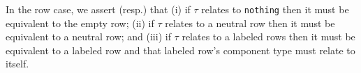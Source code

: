 \documentclass[authoryear, acmsmall, screen, review, nonacm]{acmart}
\begin{document}
In the row case, we assert (resp.) that (i) if $\tau$ relates to \verb!nothing! then it must be equivalent to the empty row; (ii) if $\tau$ relates to a neutral row then it must be equivalent to a neutral row; and (iii) if $\tau$ relates to a labeled rows then it must be equivalent to a labeled row and that labeled row's component type must relate to itself.
\begin{code}%
\>[0]\AgdaSpace{}%
\AgdaSymbol{\{}\AgdaSpace{}%
\AgdaSymbol{=}\AgdaSpace{}%
\AgdaOperator{\AgdaInductiveConstructor{R[}}\AgdaSpace{}%
\AgdaSpace{}%
\AgdaOperator{\AgdaInductiveConstructor{]}}\AgdaSymbol{\}}\AgdaSpace{}%
\AgdaSpace{}%
\AgdaSpace{}%
\AgdaSymbol{=}\AgdaSpace{}%
\AgdaSpace{}%
\AgdaSpace{}%
\<%
\\
\>[0]\AgdaSpace{}%
\AgdaSymbol{\{}\AgdaSpace{}%
\AgdaSymbol{=}\AgdaSpace{}%
\AgdaOperator{\AgdaInductiveConstructor{R[}}\AgdaSpace{}%
\AgdaSpace{}%
\AgdaOperator{\AgdaInductiveConstructor{]}}\AgdaSymbol{\}}\AgdaSpace{}%
\AgdaSpace{}%
\AgdaSymbol{(}\AgdaSpace{}%
\AgdaSymbol{(}\AgdaSpace{}%
\AgdaSymbol{))}\AgdaSpace{}%
\AgdaSymbol{=}\AgdaSpace{}%
\AgdaSpace{}%
\AgdaSpace{}%
\AgdaSymbol{(}\AgdaSpace{}%
\AgdaSymbol{)}\<%
\\
\>[0]\AgdaSpace{}%
\AgdaSymbol{\{}\AgdaSpace{}%
\AgdaSymbol{=}\AgdaSpace{}%
\AgdaOperator{\AgdaInductiveConstructor{R[}}\AgdaSpace{}%
\AgdaSpace{}%
\AgdaOperator{\AgdaInductiveConstructor{]}}\AgdaSymbol{\}}\AgdaSpace{}%
\AgdaSpace{}%
\AgdaSymbol{(}\AgdaSpace{}%
\AgdaSymbol{(}\AgdaSpace{}%
\AgdaSymbol{(}\AgdaSpace{}%
\AgdaOperator{\AgdaInductiveConstructor{,}}\AgdaSpace{}%
\AgdaSymbol{)))}\AgdaSpace{}%
\AgdaSymbol{=}\AgdaSpace{}%
\AgdaSymbol{(}\AgdaSpace{}%
\AgdaSpace{}%
\AgdaSpace{}%
\AgdaSymbol{(}\AgdaSpace{}%
\AgdaSpace{}%
\AgdaSpace{}%
\AgdaSymbol{))}\AgdaSpace{}%
\AgdaSpace{}%
\AgdaSymbol{(}\AgdaSpace{}%
\AgdaSpace{}%
\AgdaSymbol{(}\AgdaSpace{}%
\AgdaSymbol{)}\AgdaSpace{}%
\AgdaSpace{}%
\AgdaSymbol{)}\<%
\end{code}
\end{document}
